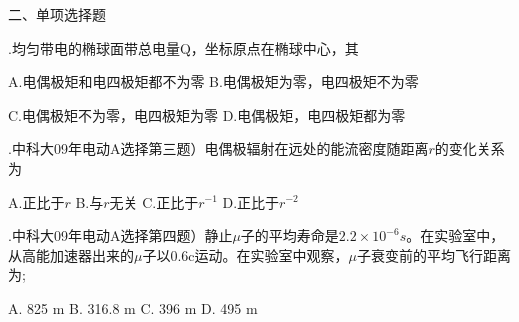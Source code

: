 \noindent
二、\hspace{0.2em}单项选择题
\vspace{0.2cm}

.\hspace{0.8em}均匀带电的椭球面带总电量Q，坐标原点在椭球中心，其
\vspace{0.2cm}

A.\hspace{0.8em}电偶极矩和电四极矩都不为零 \hspace{2.6em} B.\hspace{0.8em}电偶极矩为零，电四极矩不为零
\vspace{0.2cm}

C.\hspace{0.8em}电偶极矩不为零，电四极矩为零\hspace{2.1em} D.\hspace{0.8em}电偶极矩，电四极矩都为零
\vspace{0.2cm}

.\hspace{0.8em}中科大09年电动A选择第三题）电偶极辐射在远处的能流密度随距离$r$的变化关系为\vspace{0.2cm}

A.\hspace{0.8em}正比于$r$ \hspace{2em} B.\hspace{0.8em}与$r$无关 \hspace{2em} C.\hspace{0.8em}正比于$r^{-1}$\hspace{2em} D.\hspace{0.8em}正比于$r^{-2}$
\vspace{0.2cm}

.\hspace{0.8em}中科大09年电动A选择第四题）静止$\mu$子的平均寿命是$2.2 \times 10^{-6} s $。在实验室中，从高能加速器出来的$\mu$子以0.6c运动。在实验室中观察，$\mu$子衰变前的平均飞行距离为;
\vspace{0.2cm}

A.\hspace{0.8em} 825 m \hspace{2em} B.\hspace{0.8em} 316.8 m \hspace{2em} C.\hspace{0.8em} 396 m\hspace{2em} D.\hspace{0.8em} 495 m
\vspace{0.2cm}

